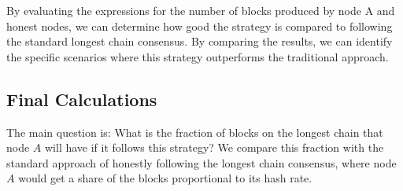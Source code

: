 By evaluating the expressions for the number of blocks produced by node A and honest nodes, we can determine how good the strategy is compared to following the standard longest chain consensus. By comparing the results, we can identify the specific scenarios where this strategy outperforms the traditional approach.

\subsection{Final Calculations}
The main question is: What is the fraction of blocks on the longest chain that node $A$ will have if it follows this strategy? We compare this fraction with the standard approach of honestly following the longest chain consensus, where node $A$ would get a share of the blocks proportional to its hash rate.

